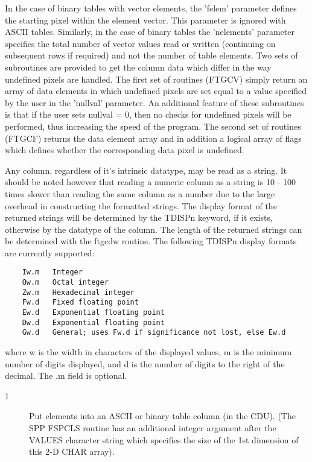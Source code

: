 \documentclass[11pt]{book}
\begin{document}
    In the case of binary tables with vector elements, the 'felem'
parameter defines the starting pixel within the element vector.  This
parameter is ignored with ASCII tables. Similarly, in the case of
binary tables the 'nelements' parameter specifies the total number of
vector values read or written (continuing on subsequent rows if
required) and not the number of table elements.  Two sets of
subroutines are provided to get the column data which differ in the way
undefined pixels are handled.  The first set of routines (FTGCV)
simply return an array of data elements in which undefined pixels are
set equal to a value specified by the user in the 'nullval' parameter.
An additional feature of these subroutines is that if the user sets
nullval = 0, then no checks for undefined pixels will be performed,
thus increasing the speed of the program.  The second set of routines
(FTGCF) returns the data element array and in addition a logical array
of flags which defines whether the corresponding data pixel is undefined.

    Any column, regardless of it's intrinsic datatype, may be read as a
    string.  It should be noted however that reading a numeric column
    as a string is 10 - 100 times slower than reading the same column as
    a number due to the large overhead in constructing the formatted
    strings.    The display format of the returned strings will be
    determined by the TDISPn keyword, if it exists, otherwise by the
    datatype of the column.  The length of the returned strings can be
    determined with the ftgcdw routine.  The following TDISPn display
    formats are currently supported:

\begin{verbatim}
    Iw.m   Integer
    Ow.m   Octal integer
    Zw.m   Hexadecimal integer
    Fw.d   Fixed floating point
    Ew.d   Exponential floating point
    Dw.d   Exponential floating point
    Gw.d   General; uses Fw.d if significance not lost, else Ew.d
\end{verbatim}
  where w is the width in characters of the displayed values, m is the minimum
  number of digits displayed, and d is the number of digits to the right of the
  decimal.  The .m field is optional.


\begin{description}
\item[1 ] Put elements into an ASCII or binary table column (in the CDU).
    (The SPP FSPCLS routine has an additional integer argument after
    the VALUES character string which specifies the size of the 1st
   dimension of this 2-D CHAR array).
\end{description}
\end{document}
